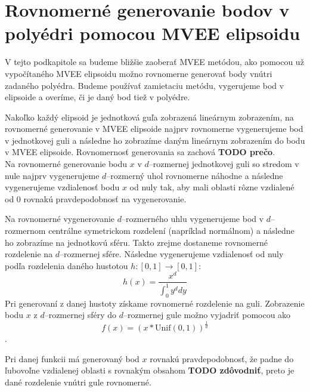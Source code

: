 \section {Rovnomerné generovanie bodov v polyédri pomocou MVEE elipsoidu}

V tejto podkapitole sa budeme bližšie zaoberať MVEE metódou, ako pomocou už vypočítaného MVEE elipsoidu možno rovnomerne generovať body vnútri zadaného polyédra. Budeme používať zamietaciu metódu, vygerujeme bod v elipsoide a overíme, či je daný bod tiež v polyédre.

Nakoľko každý elipsoid je jednotková guľa zobrazená lineárnym zobrazením, na rovnomerné generovanie v MVEE elipsoide najprv rovnomerne vygenerujeme bod v jednotkovej guli a následne ho zobrazíme daným lineárnym zobrazením do bodu v MVEE elipsoide. Rovnomernosť generovania sa zachová \textbf{TODO prečo}.\\

Na rovnomerné generovanie bodu $x$ v $d$--rozmernej jednotkovej guli so stredom v nule najprv vygenerujeme $d$--rozmerný uhol rovnomerne náhodne a následne vygenerujeme vzdialenosť bodu $x$ od nuly tak, aby mali oblasti rôzne vzdialené od $0$ rovnakú pravdepodobnosť na vygenerovanie.

Na rovnomerné vygenerovanie $d$--rozmerného uhlu vygenerujeme bod v $d$--rozmernom centrálne symetrickom rozdelení (napríklad normálnom) a následne ho zobrazíme na jednotkovú sféru. Takto zrejme dostaneme rovnomerné rozdelenie na $d$--rozmernej sfére. Následne vygenerujeme vzdialenosť od nuly podľa rozdelenia daného hustotou $h:[0,1] \rightarrow [0,1]$: $$h(x)=\frac{x^d}{\int_0^1 y^d dy}$$
Pri generovaní z danej hustoty získame rovnomerné rozdelenie na guli. Zobrazenie bodu $x$ z $d$--rozmernej sféry do $d$--rozmernej gule možno vyjadriť pomocou  ako $$f(x)=(x*\text{Unif}(0,1))^{\frac{1}{d}}$$.

Pri danej funkcii má generovaný bod $x$ rovnakú pravdepodobnosť, že padne do ľubovoľne vzdialenej oblasti s rovnakým obsahom \textbf{TODO zdôvodniť}, preto je dané rozdelenie vnútri gule rovnomerné.